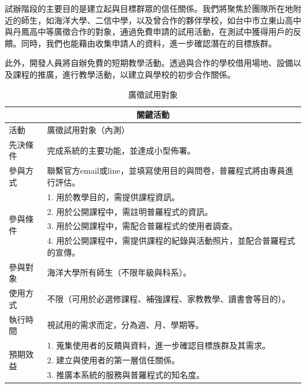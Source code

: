 試辦階段的主要目的是建立起與目標群眾的信任關係。我們將聚焦於團隊所在地附近的師生，如海洋大學、二信中學，以及曾合作的夥伴學校，如台中市立東山高中與丹鳳高中等廣徵合作的對象，通過免費申請的試用活動，在測試中獲得用戶的反饋。同時，我們也能藉由收集申請人的資料，進一步確認潛在的目標族群。

此外，開發人員將自辦免費的短期教學活動。透過與合作的學校借用場地、設備以及課程的推廣，進行教學活動，以建立與學校的初步合作關係。

\begin{table}[h]
  \centering
  \caption{廣徵試用對象}
  \begin{tabular}{|l|l|}
      \hline
      \multicolumn{2}{|c|}{\textbf{關鍵活動}} \\ \hline
      活動 & 廣徵試用對象（內測） \\ \hline
      先決條件 & 完成系統的主要功能，並達成小型佈署。 \\ \hline
      參與方式 & 聯繫官方email或line，並填寫使用目的與問卷，普羅程式將由專員進行評估。 \\ \hline
      \multirow{4}{*}{參與條件} & 1. 用於教學目的，需提供課程資訊。 \\
      & 2. 用於公開課程中，需註明普羅程式的資訊。 \\ 
      & 3. 用於公開課程中，需配合普羅程式的使用者調查。 \\ 
      & 4. 用於公開課程中，需提供課程的紀錄與活動照片，並配合普羅程式的宣傳。 \\ \hline
      參與對象 & 海洋大學所有師生（不限年級與科系）。 \\ \hline
      使用方式 & 不限（可用於必選修課程、補強課程、家教教學、讀書會等目的）。 \\ \hline
      執行時間 & 視試用的需求而定，分為週、月、學期等。 \\ \hline
      \multirow{3}{*}{預期效益} & 1. 蒐集使用者的反饋與資料，進一步確認目標族群及其需求。 \\
      & 2. 建立與使用者的第一層信任關係。 \\
      & 3. 推廣本系統的服務與普羅程式的知名度。 \\ \hline
  \end{tabular}
\end{table}

